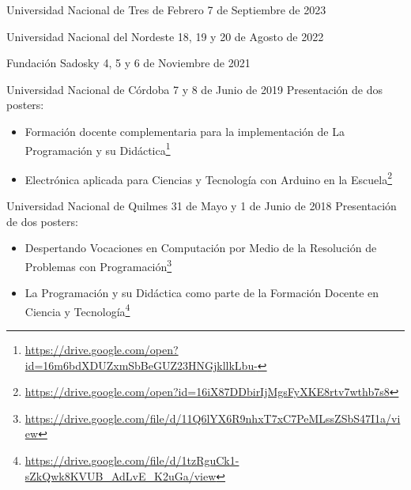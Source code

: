 \begin{enumerate}[leftmargin=0.8cm]
{\begin{itemize}[leftmargin=0.2cm]
      {Universidad Nacional de Tres de Febrero}
      {7 de Septiembre de 2023}{}

      {Universidad Nacional del Nordeste}
      {18, 19 y 20 de Agosto de 2022}{}

      {Fundación Sadosky}
      {4, 5 y 6 de Noviembre de 2021}{}

      {Universidad Nacional de Córdoba}
      {7 y 8 de Junio de 2019}
      {Presentación de dos posters:}

      \begin{itemize}
        \item Formación docente complementaria para la implementación de La Programación y su Didáctica\footnote{
          \url{https://drive.google.com/open?id=16m6bdXDUZxmSbBeGUZ23HNGjkllkLbu-}}
        \item Electrónica aplicada para Ciencias y Tecnología con Arduino en la Escuela\footnote{
          \url{https://drive.google.com/open?id=16iX87DDbirIjMgsFyXKE8rtv7wthb7s8}}
      \end{itemize}
      \medskip

      {Universidad Nacional de Quilmes}
      {31 de Mayo y 1 de Junio de 2018}
      {Presentación de dos posters:}

      \begin{itemize}
        \item Despertando Vocaciones en Computación por Medio de la Resolución de Problemas con Programación\footnote{
          \url{https://drive.google.com/file/d/11Q6lYX6R9nhxT7xC7PeMLssZSbS47I1a/view}}
        \item La Programación y su Didáctica como parte de la Formación Docente en Ciencia y Tecnología\footnote{
          \url{https://drive.google.com/file/d/1tzRguCk1-sZkQwk8KVUB_AdLvE_K2uGa/view}}
      \end{itemize}
      \medskip


\end{itemize}}
\end{enumerate}
